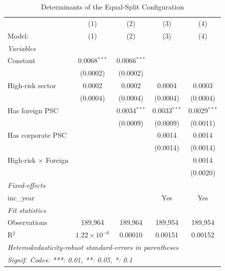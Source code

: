 
\begin{table}[htbp]
   \caption{\label{tab:reg} Determinants of the Equal-Split Configuration}
   \centering
   \begin{tabular}{lcccc}
      \tabularnewline \midrule \midrule
                                  & (1)                   & (2)            & (3)            & (4) \\   
      Model:                      & (1)                   & (2)            & (3)            & (4)\\  
      \midrule
      \emph{Variables}\\
      Constant                    & 0.0068$^{***}$        & 0.0066$^{***}$ &                &   \\   
                                  & (0.0002)              & (0.0002)       &                &   \\   
      High-risk sector            & 0.0002                & 0.0002         & 0.0004         & 0.0003\\   
                                  & (0.0004)              & (0.0004)       & (0.0004)       & (0.0004)\\   
      Has foreign PSC             &                       & 0.0034$^{***}$ & 0.0033$^{***}$ & 0.0029$^{***}$\\   
                                  &                       & (0.0009)       & (0.0009)       & (0.0011)\\   
      Has corporate PSC           &                       &                & 0.0014         & 0.0014\\   
                                  &                       &                & (0.0014)       & (0.0014)\\   
      High-risk $\times$ Foreign  &                       &                &                & 0.0014\\   
                                  &                       &                &                & (0.0020)\\   
      \midrule
      \emph{Fixed-effects}\\
      inc\_year                   &                       &                & Yes            & Yes\\  
      \midrule
      \emph{Fit statistics}\\
      Observations                & 189,964               & 189,964        & 189,954        & 189,954\\  
      R$^2$                       & $1.22\times 10^{-6}$  & 0.00010        & 0.00151        & 0.00152\\  
      \midrule \midrule
      \multicolumn{5}{l}{\emph{Heteroskedasticity-robust standard-errors in parentheses}}\\
      \multicolumn{5}{l}{\emph{Signif. Codes: ***: 0.01, **: 0.05, *: 0.1}}\\
   \end{tabular}
   

\end{table}
